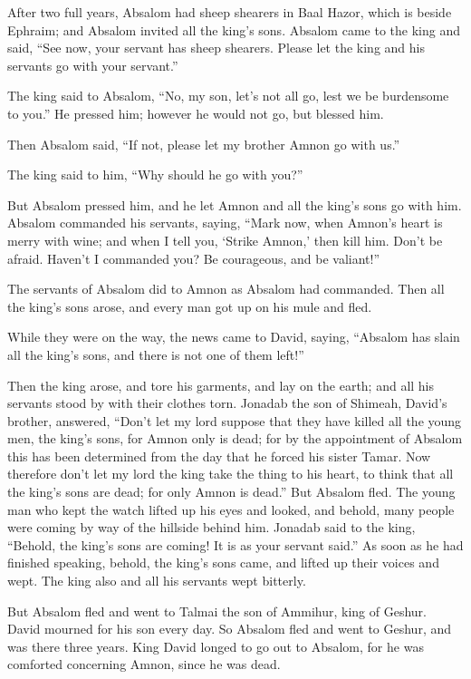  After two full years, Absalom had sheep shearers in Baal
Hazor, which is beside Ephraim; and Absalom invited all the king's sons.
 Absalom came to the king and said, ``See now, your
servant has sheep shearers. Please let the king and his servants go with
your servant.''

 The king said to Absalom, ``No, my son, let's not all
go, lest we be burdensome to you.'' He pressed him; however he would not
go, but blessed him.

 Then Absalom said, ``If not, please let my brother Amnon
go with us.''

The king said to him, ``Why should he go with you?''

 But Absalom pressed him, and he let Amnon and all the
king's sons go with him.  Absalom commanded his servants,
saying, ``Mark now, when Amnon's heart is merry with wine; and when I
tell you, `Strike Amnon,' then kill him. Don't be afraid. Haven't I
commanded you? Be courageous, and be valiant!''

 The servants of Absalom did to Amnon as Absalom had
commanded. Then all the king's sons arose, and every man got up on his
mule and fled.

 While they were on the way, the news came to David,
saying, ``Absalom has slain all the king's sons, and there is not one of
them left!''

 Then the king arose, and tore his garments, and lay on
the earth; and all his servants stood by with their clothes torn.
 Jonadab the son of Shimeah, David's brother, answered,
``Don't let my lord suppose that they have killed all the young men, the
king's sons, for Amnon only is dead; for by the appointment of Absalom
this has been determined from the day that he forced his sister Tamar.
 Now therefore don't let my lord the king take the thing
to his heart, to think that all the king's sons are dead; for only Amnon
is dead.''  But Absalom fled. The young man who kept the
watch lifted up his eyes and looked, and behold, many people were coming
by way of the hillside behind him.  Jonadab said to the
king, ``Behold, the king's sons are coming! It is as your servant
said.''  As soon as he had finished speaking, behold, the
king's sons came, and lifted up their voices and wept. The king also and
all his servants wept bitterly.

 But Absalom fled and went to Talmai the son of Ammihur,
king of Geshur. David mourned for his son every day.  So
Absalom fled and went to Geshur, and was there three years.
 King David longed to go out to Absalom, for he was
comforted concerning Amnon, since he was dead.

